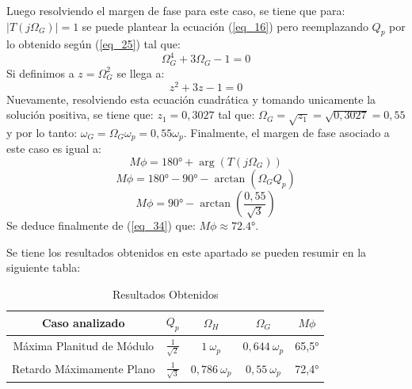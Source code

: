 \documentclass[12pt,a4paper]{article}
\begin{document}
\begin{itemize}
    Luego resolviendo el margen de fase para este caso, se tiene que para: $|T(j\Omega_G)| = 1$ se puede plantear la ecuación (\ref{eq_16}) pero reemplazando $Q_p$ por lo obtenido según (\ref{eq_25}) tal que:
    \begin{equation}
        \label{eq_30}
        \Omega_G^4 + 3\Omega_G - 1 = 0
    \end{equation}
    Si definimos a $z=\Omega_G^2$ se llega a:
    \begin{equation}
        \label{eq_31}
        z^2 + 3z - 1 = 0
    \end{equation}
    Nuevamente, resolviendo esta ecuación cuadrática y tomando unicamente la solución positiva, se tiene que: $z_1=0,3027$ tal que: $\Omega_G = \sqrt{z_1} = \sqrt{0,3027} = 0,55$ y por lo tanto: $\omega_G = \Omega_G \omega_p = 0,55 \omega_p$. Finalmente, el margen de fase asociado a este caso es igual a:
    \begin{equation}
        \label{eq_32}
        M\phi = \ang{180} + \arg(T(j\Omega_G))
    \end{equation}
    \begin{equation}
        \label{eq_33}
        M\phi = \ang{180} - \ang{90} - \arctan(\Omega_G Q_p)  
    \end{equation}
    \begin{equation}
        \label{eq_34}
        M\phi = \ang{90} - \arctan\left(\frac{0,55}{\sqrt{3}}\right) 
    \end{equation}
    Se deduce finalmente de (\ref{eq_34}) que: $M\phi \approx \ang{72,4}$.    
\end{itemize}

Se tiene los resultados obtenidos en este apartado se pueden resumir en la siguiente tabla:
    \begin{table}[H]
        \begin{center}
        \begin{tabular}{| c | c | c | c | c |}
            \hline
            Caso analizado & $Q_p$ & $\Omega_H$ & $\Omega_G$ & $M\phi$ \\ \hline
            Máxima Planitud de Módulo & $\frac{1}{\sqrt{2}}$ & $1 \ \omega_p$ & $0,644 \ \omega_p$ & \ang{65,5} \\ \hline
            Retardo Máximamente Plano & $\frac{1}{\sqrt{3}}$ & $0,786 \ \omega_p $ & $0,55 \ \omega_p$ & \ang{72,4} \\ \hline
        \end{tabular}
        \caption{Resultados Obtenidos}
        \label{tab:tb_1}
        \end{center}
    \end{table}
    
\end{document}
